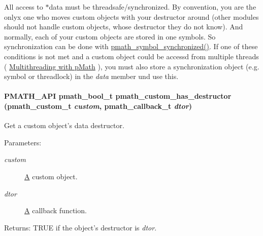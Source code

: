 All access to $\ast$data must be threadsafe/synchronized. By convention, you are the onlyx one who moves custom objects with your destructor around (other modules should not handle custom objects, whose destructor they do not know). And normally, each of your custom objects are stored in one symbols. So synchronization can be done with \hyperlink{group__symbols_g95b141d9cb33fba80d6a807f304ee3b7}{pmath\_\-symbol\_\-synchronized()}. If one of these conditions is not met and a custom object could be accessd from multiple threads ( \hyperlink{group__threads}{Multithreading with pMath} ), you must also store a synchronization object (e.g. symbol or threadlock) in the {\em data\/} member und use this. \hypertarget{group__custom_g0847bc90fa81ddfdf0f3ff84d32947cf}{
\paragraph[{pmath\_\-custom\_\-has\_\-destructor}]{\setlength{\rightskip}{0pt plus 5cm}PMATH\_\-API {\bf pmath\_\-bool\_\-t} pmath\_\-custom\_\-has\_\-destructor ({\bf pmath\_\-custom\_\-t} {\em custom}, \/  {\bf pmath\_\-callback\_\-t} {\em dtor})}\hfill}
\label{group__custom_g0847bc90fa81ddfdf0f3ff84d32947cf}


Get a custom object's data destructor. 

\begin{Desc}
\item[Parameters:]
\begin{description}
\item[{\em custom}]\hyperlink{class_a}{A} custom object. \item[{\em dtor}]\hyperlink{class_a}{A} callback function. \end{description}
\end{Desc}
\begin{Desc}
\item[Returns:]TRUE if the object's destructor is {\em dtor\/}. \end{Desc}
